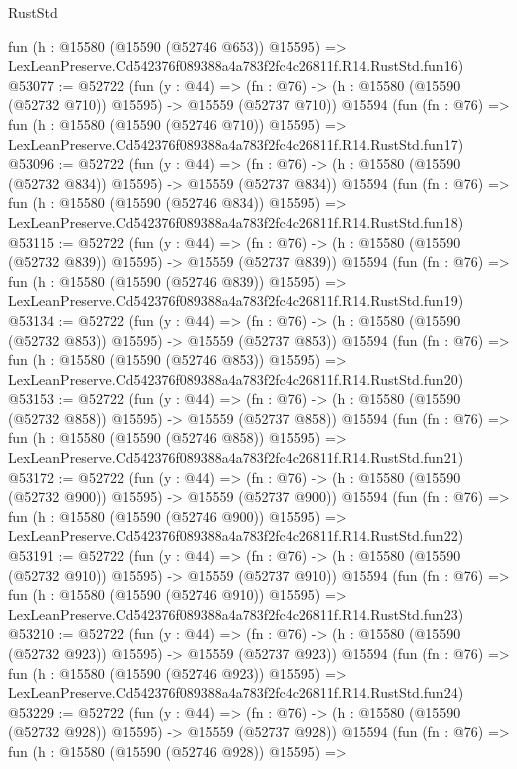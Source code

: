 \begin{lexlean}{RustStd}
\begin{coremodule}
    fun (h : @15580 (@15590 (@52746 @653)) @15595) =>
    LexLeanPreserve.Cd542376f089388a4a783f2fc4c26811f.R14.RustStd.fun16)
@53077 := @52722
    (fun (y : @44) =>
    (fn : @76) -> (h : @15580 (@15590 (@52732 @710)) @15595) -> @15559 (@52737 @710))
    @15594
    (fun (fn : @76) =>
    fun (h : @15580 (@15590 (@52746 @710)) @15595) =>
    LexLeanPreserve.Cd542376f089388a4a783f2fc4c26811f.R14.RustStd.fun17)
@53096 := @52722
    (fun (y : @44) =>
    (fn : @76) -> (h : @15580 (@15590 (@52732 @834)) @15595) -> @15559 (@52737 @834))
    @15594
    (fun (fn : @76) =>
    fun (h : @15580 (@15590 (@52746 @834)) @15595) =>
    LexLeanPreserve.Cd542376f089388a4a783f2fc4c26811f.R14.RustStd.fun18)
@53115 := @52722
    (fun (y : @44) =>
    (fn : @76) -> (h : @15580 (@15590 (@52732 @839)) @15595) -> @15559 (@52737 @839))
    @15594
    (fun (fn : @76) =>
    fun (h : @15580 (@15590 (@52746 @839)) @15595) =>
    LexLeanPreserve.Cd542376f089388a4a783f2fc4c26811f.R14.RustStd.fun19)
@53134 := @52722
    (fun (y : @44) =>
    (fn : @76) -> (h : @15580 (@15590 (@52732 @853)) @15595) -> @15559 (@52737 @853))
    @15594
    (fun (fn : @76) =>
    fun (h : @15580 (@15590 (@52746 @853)) @15595) =>
    LexLeanPreserve.Cd542376f089388a4a783f2fc4c26811f.R14.RustStd.fun20)
@53153 := @52722
    (fun (y : @44) =>
    (fn : @76) -> (h : @15580 (@15590 (@52732 @858)) @15595) -> @15559 (@52737 @858))
    @15594
    (fun (fn : @76) =>
    fun (h : @15580 (@15590 (@52746 @858)) @15595) =>
    LexLeanPreserve.Cd542376f089388a4a783f2fc4c26811f.R14.RustStd.fun21)
@53172 := @52722
    (fun (y : @44) =>
    (fn : @76) -> (h : @15580 (@15590 (@52732 @900)) @15595) -> @15559 (@52737 @900))
    @15594
    (fun (fn : @76) =>
    fun (h : @15580 (@15590 (@52746 @900)) @15595) =>
    LexLeanPreserve.Cd542376f089388a4a783f2fc4c26811f.R14.RustStd.fun22)
@53191 := @52722
    (fun (y : @44) =>
    (fn : @76) -> (h : @15580 (@15590 (@52732 @910)) @15595) -> @15559 (@52737 @910))
    @15594
    (fun (fn : @76) =>
    fun (h : @15580 (@15590 (@52746 @910)) @15595) =>
    LexLeanPreserve.Cd542376f089388a4a783f2fc4c26811f.R14.RustStd.fun23)
@53210 := @52722
    (fun (y : @44) =>
    (fn : @76) -> (h : @15580 (@15590 (@52732 @923)) @15595) -> @15559 (@52737 @923))
    @15594
    (fun (fn : @76) =>
    fun (h : @15580 (@15590 (@52746 @923)) @15595) =>
    LexLeanPreserve.Cd542376f089388a4a783f2fc4c26811f.R14.RustStd.fun24)
@53229 := @52722
    (fun (y : @44) =>
    (fn : @76) -> (h : @15580 (@15590 (@52732 @928)) @15595) -> @15559 (@52737 @928))
    @15594
    (fun (fn : @76) =>
    fun (h : @15580 (@15590 (@52746 @928)) @15595) =>

\end{coremodule}
\end{lexlean}
